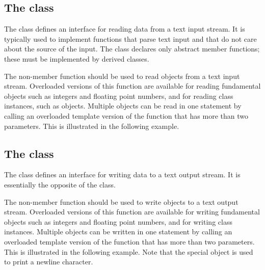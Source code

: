 
\subsection*{The  class}

The  class defines an interface for reading data from a
text input stream. It is typically used to implement functions that parse
text input and that do not care about the source of the input. The
 class declares only abstract member functions; these
must be implemented by derived classes.

The non-member function  should be used to read objects from
a text input stream. Overloaded versions of this function are available
for reading fundamental objects such as integers and floating point
numbers, and for reading class instances, such as  objects.
Multiple objects can be read in one statement by calling an overloaded
template version of the  function that has more than two
parameters. This is illustrated in the following example.



\subsection*{The  class}

The  class defines an interface for writing data to a
text output stream. It is essentially the opposite of the
 class.

The non-member function  should be used to write objects to
a text output stream. Overloaded versions of this function are available
for writing fundamental objects such as integers and floating point
numbers, and for writing class instances. Multiple objects can be written
in one statement by calling an overloaded template version of the
 function that has more than two parameters. This is
illustrated in the following example. Note that the special object
 is used to print a newline character.




